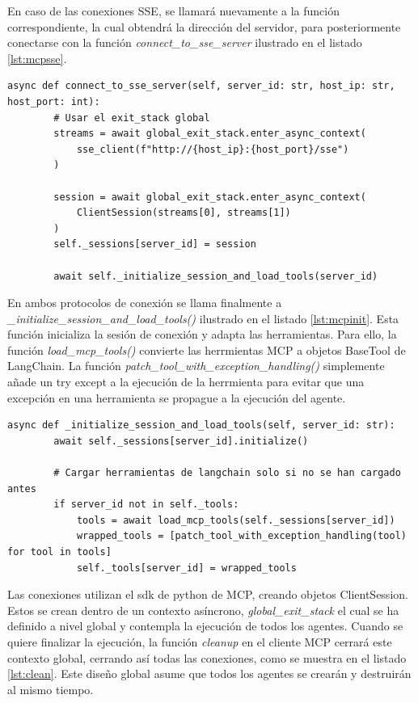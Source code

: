 En caso de las conexiones SSE, se llamará nuevamente a la función correspondiente, la cual obtendrá la dirección del servidor, para posteriormente conectarse con la función \textit{connect\_to\_sse\_server} ilustrado en el listado \ref{lst:mcpsse}.  

\begin{lstlisting}[caption={Función \textit{connect\_to\_sse\_server en cliente MCP}},label={lst:mcpsse}]
    async def connect_to_sse_server(self, server_id: str, host_ip: str, host_port: int):
        # Usar el exit_stack global
        streams = await global_exit_stack.enter_async_context(
            sse_client(f"http://{host_ip}:{host_port}/sse")
        )

        session = await global_exit_stack.enter_async_context(
            ClientSession(streams[0], streams[1])
        )
        self._sessions[server_id] = session

        await self._initialize_session_and_load_tools(server_id)
\end{lstlisting}


En ambos protocolos de conexión se llama finalmente a \textit{\_initialize\_session\_and\_load\_tools()} ilustrado en el listado \ref{lst:mcpinit}. Esta función inicializa la sesión de conexión y adapta las herramientas. Para ello, la función \textit{load\_mcp\_tools()} convierte las herrmientas MCP a objetos BaseTool de LangChain. La función \textit{patch\_tool\_with\_exception\_handling()} simplemente añade un try except a la ejecución de la herrmienta para evitar que una excepción en una herramienta se propague a la ejecución del agente.

\begin{lstlisting}[caption={Función \textit{\_initialize\_session\_and\_load\_tools}},label={lst:mcpinit}]
    async def _initialize_session_and_load_tools(self, server_id: str):
        await self._sessions[server_id].initialize()

        # Cargar herramientas de langchain solo si no se han cargado antes
        if server_id not in self._tools:
            tools = await load_mcp_tools(self._sessions[server_id])
            wrapped_tools = [patch_tool_with_exception_handling(tool) for tool in tools]
            self._tools[server_id] = wrapped_tools
\end{lstlisting}


Las conexiones utilizan el sdk de python de MCP, creando objetos ClientSession. Estos se crean dentro de un contexto asíncrono, \textit{global\_exit\_stack} el cual se ha definido a nivel global y contempla la ejecución de todos los agentes. Cuando se quiere finalizar la ejecución, la función \textit{cleanup} en el cliente MCP cerrará este contexto global, cerrando así todas las conexiones, como se muestra en el listado \ref{lst:clean}. Este diseño global asume que todos los agentes se crearán y destruirán al mismo tiempo.

